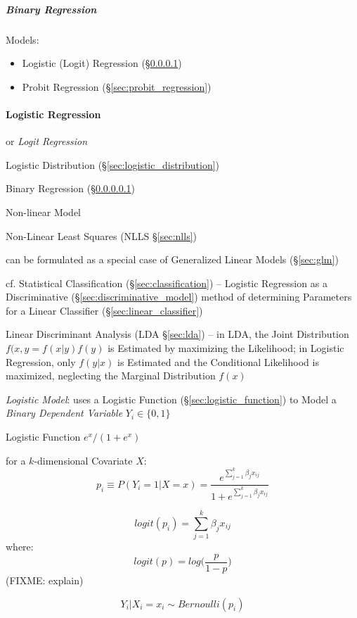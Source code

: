 \subparagraph{Binary Regression}\label{sec:binary_regression}

Models:
\begin{itemize}
  \item Logistic (Logit) Regression (\S\ref{sec:logistic_regression})
  \item Probit Regression (\S\ref{sec:probit_regression})
\end{itemize}



\paragraph{Logistic Regression}\label{sec:logistic_regression}\hfill

or \emph{Logit Regression}

\fist Logistic Distribution (\S\ref{sec:logistic_distribution})

Binary Regression (\S\ref{sec:binary_regression})

Non-linear Model

Non-Linear Least Squares (NLLS \S\ref{sec:nlls})

can be formulated as a special case of Generalized Linear Models
(\S\ref{sec:glm})

cf. Statistical Classification (\S\ref{sec:classification}) -- Logistic
Regression as a Discriminative (\S\ref{sec:discriminative_model}) method of
determining Parameters for a Linear Classifier (\S\ref{sec:linear_classifier})

\fist Linear Discriminant Analysis (LDA \S\ref{sec:lda}) -- in LDA, the Joint
Distribution $f(x,y = f(x|y)f(y)$ is Estimated by maximizing the Likelihood; in
Logistic Regression, only $f(y|x)$ is Estimated and the Conditional Likelihood
is maximized, neglecting the Marginal Distribution $f(x)$

\emph{Logistic Model}: uses a Logistic Function (\S\ref{sec:logistic_function})
to Model a \emph{Binary Dependent Variable} $Y_i \in \{ 0, 1 \}$

Logistic Function $e^x / (1 + e^x)$

for a $k$-dimensional Covariate $X$:
\[
  p_i \equiv P(Y_i = 1 | X = x) = \frac{
    e^{\sum_{j=1}^k \beta_j x_{ij}}
  }{
    1 + e^{\sum_{j=1}^k \beta_j x_{ij}}
  }
\]

\[
  logit(p_i) = \sum_{j=1}^k \beta_j x_{ij}
\]
where:
\[
  logit(p) = log\Big(\frac{p}{1-p}\Big)
\]
(FIXME: explain)

\[
  Y_i | X_i = x_i \sim Bernoulli(p_i)
\]

